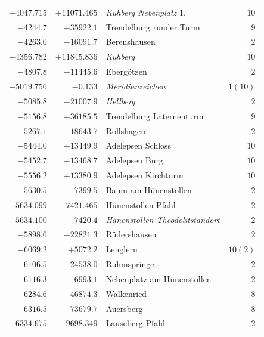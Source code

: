 \begin{center}
\begin{tabular}{r|r|p{170pt}|r}
\(-4047.715\)&\(+11071.465\)&\textit{Kuhberg Nebenplatz} 1.&\(10\)\\
\(-4244.7\)&\(+35922.1\)&Trendelburg runder Turm&\(9\)\\
\(-4263.0\)&\(-16091.7\)&Berenshausen&\(2\)\\
\(-4356.782\)&\(+11845.836\)&\textit{Kuhberg}&\(10\)\\
\(-4807.8\)&\(-11445.6\)&Ebergötzen&\(2\)\\
\(-5019.756\)&\(-0.133\)&\textit{Meridianzeichen}&\(1(10)\)\\
\(-5085.8\)&\(-21007.9\)&\textit{Hellberg}&\(2\)\\
\(-5156.8\)&\(+36185.5\)&Trendelburg Laternenturm&\(9\)\\
\(-5267.1\)&\(-18643.7\)&Rollshagen&\(2\)\\
\(-5444.0\)&\(+13449.9\)&Adelepsen Schloss&\(10\)\\
\(-5452.7\)&\(+13468.7\)&Adelepsen Burg&\(10\)\\
\(-5556.2\)&\(+13380.9\)&Adelepsen Kirchturm&\(10\)\\
\(-5630.5\)&\(-7399.5\)&Baum am Hünenstollen&\(2\)\\
\(-5634.099\)&\(-7421.465\)&Hünenstollen Pfahl&\(2\)\\
\(-5634.100\)&\(-7420.4\)&\textit{Hänenstollen Theodolitstandort}&\(2\)\\
\(-5898.6\)&\(-22821.3\)&Rüdershausen&\(2\)\\
\(-6069.2\)&\(+5072.2\)&Lenglern&\(10 (2)\)\\
\(-6106.5\)&\(-24538.0\)&Ruhmspringe&\(2\)\\
\(-6116.3\)&\(-6993.1\)&Nebenplatz am Hünenstollen&\(2\)\\
\(-6284.6\)&\(-46874.3\)&Walkenried&\(8\)\\
\(-6316.5\)&\(-73679.7\)&Auersberg&\(8\)\\
\(-6334.675\)&\(-9698.349\)&Lauseberg Pfahl&\(2\)\\
\hline\end{tabular}\endgroup\end{center}
\clearpage

